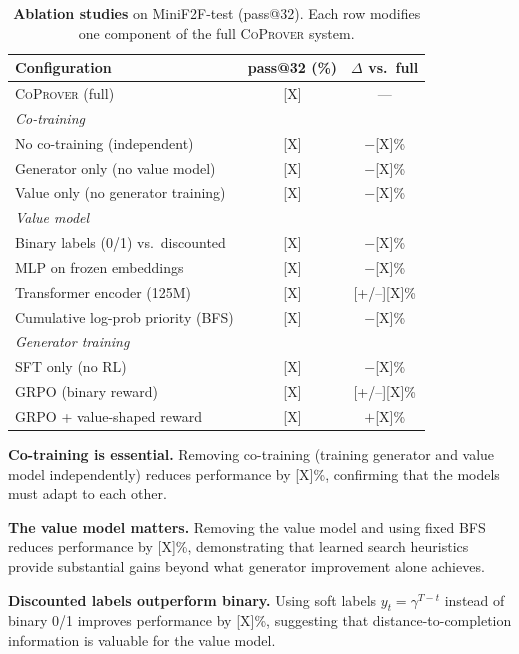 \documentclass{article}
\newcommand{\coprover}{\textsc{CoProver}}
\begin{document}
\begin{table}[t]
\centering
\caption{\textbf{Ablation studies} on MiniF2F-test (pass@32). Each row modifies one component of the full \coprover{} system.}
\label{tab:ablations}
\vspace{0.5em}
\begin{tabular}{lcc}
\toprule
\textbf{Configuration} & \textbf{pass@32 (\%)} & \textbf{$\Delta$ vs.\ full} \\
\midrule
\coprover{} (full) & [X] & --- \\
\midrule
\multicolumn{3}{l}{\textit{Co-training}} \\
\quad No co-training (independent) & [X] & $-$[X]\% \\
\quad Generator only (no value model) & [X] & $-$[X]\% \\
\quad Value only (no generator training) & [X] & $-$[X]\% \\
\midrule
\multicolumn{3}{l}{\textit{Value model}} \\
\quad Binary labels (0/1) vs.\ discounted & [X] & $-$[X]\% \\
\quad MLP on frozen embeddings & [X] & $-$[X]\% \\
\quad Transformer encoder (125M) & [X] & [+/--][X]\% \\
\quad Cumulative log-prob priority (BFS) & [X] & $-$[X]\% \\
\midrule
\multicolumn{3}{l}{\textit{Generator training}} \\
\quad SFT only (no RL) & [X] & $-$[X]\% \\
\quad GRPO (binary reward) & [X] & [+/--][X]\% \\
\quad GRPO + value-shaped reward & [X] & $+$[X]\% \\
\bottomrule
\end{tabular}
\end{table}

\textbf{Co-training is essential.} Removing co-training (training generator and value model independently) reduces performance by [X]\%, confirming that the models must adapt to each other.

\textbf{The value model matters.} Removing the value model and using fixed BFS reduces performance by [X]\%, demonstrating that learned search heuristics provide substantial gains beyond what generator improvement alone achieves.

\textbf{Discounted labels outperform binary.} Using soft labels $y_t = \gamma^{T-t}$ instead of binary 0/1 improves performance by [X]\%, suggesting that distance-to-completion information is valuable for the value model.
\end{document}
